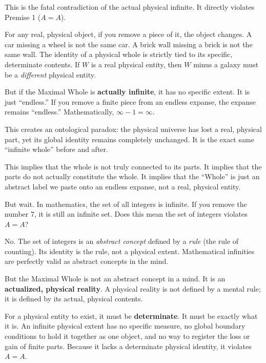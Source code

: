 \documentclass[11pt]{article}
\theoremstyle{canonstyle}
\begin{document}
This is the fatal contradiction of the actual physical infinite. It directly violates Premise 1 ($A=A$).

For any real, physical object, if you remove a piece of it, the object changes. A car missing a wheel is not the same car. A brick wall missing a brick is not the same wall. The identity of a physical whole is strictly tied to its specific, determinate contents. If $W$ is a real physical entity, then $W$ minus a galaxy must be a \emph{different} physical entity.

But if the Maximal Whole is \textbf{actually infinite}, it has no specific extent. It is just ``endless.'' If you remove a finite piece from an endless expanse, the expanse remains ``endless.'' Mathematically, $\infty - 1 = \infty$. 

This creates an ontological paradox: the physical universe has lost a real, physical part, yet its global identity remains completely unchanged. It is the exact same ``infinite whole'' before and after. 

This implies that the whole is not truly connected to its parts. It implies that the parts do not actually constitute the whole. It implies that the ``Whole'' is just an abstract label we paste onto an endless expanse, not a real, physical entity. 

\begin{reflect}
But wait. In mathematics, the set of all integers is infinite. If you remove the number 7, it is still an infinite set. Does this mean the set of integers violates $A=A$?
\end{reflect}

No. The set of integers is an \emph{abstract concept} defined by a \emph{rule} (the rule of counting). Its identity is the rule, not a physical extent. Mathematical infinities are perfectly valid as abstract concepts in the mind.

But the Maximal Whole is not an abstract concept in a mind. It is an \textbf{actualized, physical reality}. A physical reality is not defined by a mental rule; it is defined by its actual, physical contents. 

For a physical entity to exist, it must be \textbf{determinate}. It must be exactly what it is. An infinite physical extent has no specific measure, no global boundary conditions to hold it together as one object, and no way to register the loss or gain of finite parts. Because it lacks a determinate physical identity, it violates $A=A$.
\end{document}
